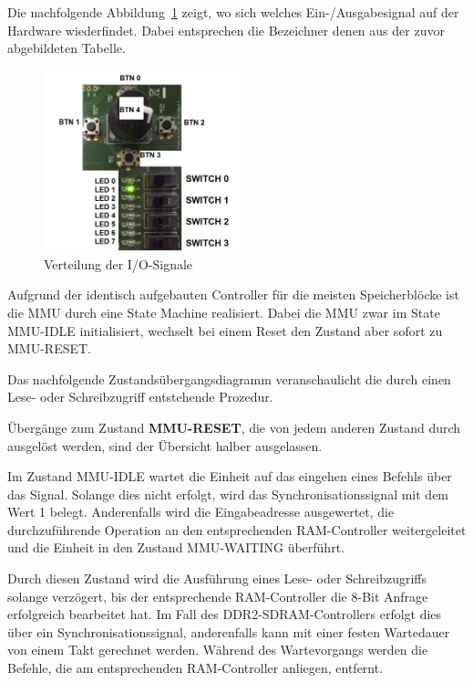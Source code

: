Die nachfolgende Abbildung~\ref{fig:pinning} zeigt, wo sich welches Ein-/Ausgabesignal auf der Hardware wiederfindet. Dabei entsprechen die Bezeichner denen aus der zuvor abgebildeten Tabelle.

\begin{figure}[H]
	\centering
	\label{fig:pinning}
		\includegraphics[width=0.5\textwidth]{pinning.png}
	\caption{Verteilung der I/O-Signale}
\end{figure}



Aufgrund der identisch aufgebauten Controller f\"ur die meisten Speicherbl\"ocke ist die MMU durch eine State Machine realisiert. Dabei die MMU zwar im State MMU-IDLE initialisiert, wechselt bei einem Reset den Zustand aber sofort zu MMU-RESET.

Das nachfolgende Zustands\"ubergangsdiagramm veranschaulicht die durch einen Lese- oder Schreibzugriff entstehende Prozedur.

{\"Uberg\"ange zum Zustand \textbf{MMU-RESET}, die von jedem anderen Zustand durch  ausgel\"ost werden, sind der \"Ubersicht halber ausgelassen.}


Im Zustand MMU-IDLE wartet die Einheit auf das eingehen eines Befehls \"uber das  Signal. Solange dies nicht erfolgt, wird das Synchronisationssignal  mit dem Wert 1 belegt. Anderenfalls wird die Eingabeadresse ausgewertet, die durchzuf\"uhrende Operation an den entsprechenden RAM-Controller weitergeleitet und die Einheit in den Zustand MMU-WAITING \"uberf\"uhrt.


Durch diesen Zustand wird die Ausf\"uhrung eines Lese- oder Schreibzugriffs solange verz\"ogert, bis der entsprechende RAM-Controller die 8-Bit Anfrage erfolgreich bearbeitet hat. Im Fall des DDR2-SDRAM-Controllers erfolgt dies \"uber ein Synchronisationssignal, anderenfalls kann mit einer festen Wartedauer von einem Takt gerechnet werden. W\"ahrend des Wartevorgangs werden die Befehle, die am entsprechenden RAM-Controller anliegen, entfernt.

